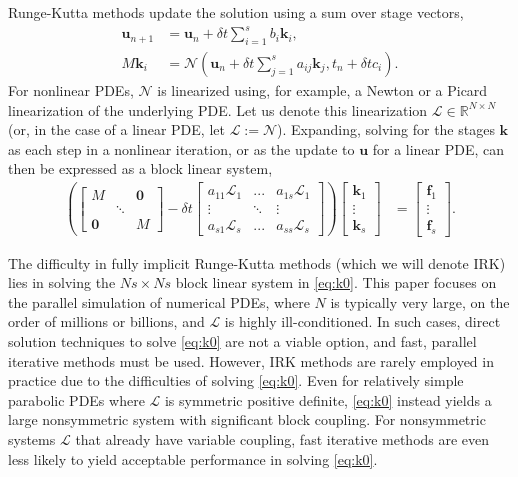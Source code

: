 \documentclass[review]{siamart}
\begin{document}
Runge-Kutta methods update the solution using a sum over stage vectors,
%
\begin{align*}
\mathbf{u}_{n+1} & = \mathbf{u}_n + \delta t \sum_{i=1}^s b_i\mathbf{k}_i, \\
M\mathbf{k}_i & = \mathcal{N}\left(\mathbf{u}_n + \delta t\sum_{j=1}^s a_{ij}\mathbf{k}_j, t_n+\delta tc_i\right).
\end{align*}
%
For nonlinear PDEs, $\mathcal{N}$ is linearized using, for example, a Newton or a Picard
linearization of the underlying PDE. Let us denote this linearization ${\mathcal{L}}\in\mathbb{R}^{N\times N}$
(or, in the case of a linear PDE, let $\mathcal{L} := \mathcal{N}$).
Expanding, solving for the stages $\mathbf{k}$ as each step in a nonlinear iteration, or
as the update to $\mathbf{u}$ for a linear PDE, can then be expressed as a block linear system,
%
\begin{align}\label{eq:k0}
\left( \begin{bmatrix} M  & & \mathbf{0} \\ & \ddots \\ \mathbf{0} & & M\end{bmatrix}
	- \delta t \begin{bmatrix} a_{11}\mathcal{L}_1 & ... & a_{1s}\mathcal{L}_1 \\
	\vdots & \ddots & \vdots \\ a_{s1}\mathcal{L}_s & ... & a_{ss} \mathcal{L}_s \end{bmatrix} \right)
	\begin{bmatrix} \mathbf{k}_1 \\ \vdots \\ \mathbf{k}_s \end{bmatrix} 
& = \begin{bmatrix} \mathbf{f}_1 \\ \vdots \\ \mathbf{f}_s \end{bmatrix}.
\end{align}
%

The difficulty in fully implicit Runge-Kutta methods (which we will denote IRK) lies in
solving the $Ns\times Ns$ block linear system in \eqref{eq:k0}. This paper focuses on the
parallel simulation of numerical PDEs, where $N$ is typically very large, on the order of
millions or billions, and $\mathcal{L}$ is highly ill-conditioned. In such cases, direct
solution techniques to solve \eqref{eq:k0} are not a viable option, and fast, parallel 
iterative methods must be used. However, IRK methods are rarely employed in practice due
to the difficulties of solving \eqref{eq:k0}. Even for relatively simple
parabolic PDEs where $\mathcal{L}$ is symmetric positive definite, \eqref{eq:k0}
instead yields a large nonsymmetric system with significant block coupling. For
nonsymmetric systems $\mathcal{L}$ that already have variable coupling, fast iterative
methods are even less likely to yield acceptable performance in solving \eqref{eq:k0}.
\end{document}
